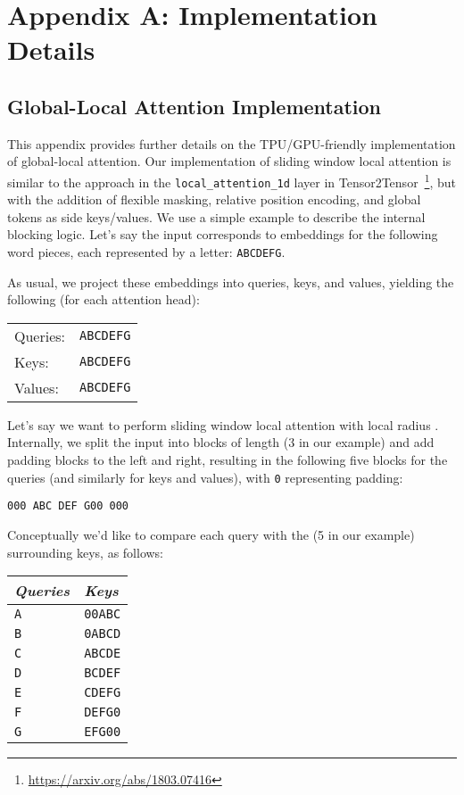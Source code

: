 \documentclass[11pt,a4paper]{article}
\begin{document}
\clearpage

\appendix

\section*{Appendix A: Implementation Details}\label{app:implementation}

\subsection*{Global-Local Attention Implementation}

This appendix provides further details on the TPU/GPU-friendly implementation of global-local attention. 
Our implementation of sliding window local attention is similar to the approach in the \texttt{local\_attention\_1d} layer in Tensor2Tensor~\footnote{\url{https://arxiv.org/abs/1803.07416}}, but with the addition of flexible masking, relative position encoding, and global tokens as side keys/values. We use a simple example to describe the internal blocking logic. Let's say the input corresponds to embeddings for the following word pieces, each represented by a letter: \texttt{ABCDEFG}.

As usual, we project these embeddings into queries, keys, and values, yielding the following (for each attention head):

\begin{tabular}{ll} 
Queries: &  \texttt{ABCDEFG} \\
Keys:    &  \texttt{ABCDEFG} \\
Values:  &  \texttt{ABCDEFG} \\
\end{tabular}

Let's say we want to perform sliding window local attention with local radius . Internally, we split the input into blocks of length  (3 in our example) and add padding blocks to the left and right, resulting in the following five blocks for the queries (and similarly for keys and values), with \texttt{0} representing padding:

\texttt{000 ABC DEF G00 000}

Conceptually we'd like to compare each query with the  (5 in our example) surrounding keys, as follows:

\begin{tabular}{l|l} 
{\em Queries} & {\em Keys} \\ \hline
\texttt{A}  &   \texttt{00ABC} \\
\texttt{B}  &   \texttt{0ABCD} \\
\texttt{C}  &   \texttt{ABCDE} \\
\texttt{D}  &   \texttt{BCDEF} \\
\texttt{E}  &   \texttt{CDEFG} \\
\texttt{F}  &   \texttt{DEFG0} \\
\texttt{G}  &   \texttt{EFG00} \\
\end{tabular}
\end{document}
